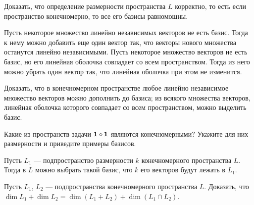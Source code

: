 \documentclass[12pt]{article}
\begin{document}
\z Доказать, что определение размерности пространства $L$
корректно, то есть если пространство конечномерно, то все его базисы
равномощны.

\z	\p Пусть некоторое множество линейно независимых
векторов не есть базис. Тогда к нему можно добавить еще один вектор
так, что векторы нового множества останутся линейно независимыми.
	\p Пусть некоторое множество векторов не есть базис,
но его линейная оболочка совпадает со всем пространством.
Тогда из него можно убрать один вектор так,
что линейная оболочка при этом не изменится.


\z Доказать, что в конечномерном пространстве
	\p любое линейно независимое множество векторов можно дополнить до базиса;
	\p из всякого множества векторов, линейная оболочка которого
совпадает со всем пространством, можно выделить базис.

\z Какие из пространств задачи $\bf1\diamond1$ являются конечномерными? Укажите для них размерности и приведите примеры базисов.

\z Пусть $L_1$ --- подпространство размерности $k$ конечномерного пространства $L$. Тогда в $L$ можно выбрать такой базис, что $k$
его векторов будут лежать в $L_1$.

\z Пусть $L_1$, $L_2$ --- подпространства конечномерного пространства $L$.
Доказать, что $\dim L_1 + \dim L_2 = \dim(L_1 + L_2 ) + \dim(L_1 \cap L_2)$.
\end{document}
